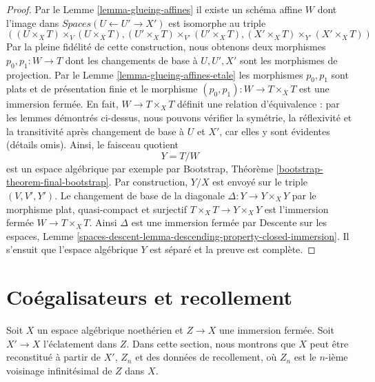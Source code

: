 \begin{proof}
\medskip\noindent
Par le Lemme \ref{lemma-glueing-affines} il existe un schéma affine $W$ dont
l'image dans $\textit{Spaces}(U \leftarrow U' \to X')$ est isomorphe au
triple
$$
((U \times_X T) \times_V (U \times_X T),
(U' \times_X T) \times_{V'} (U' \times_X T),
(X' \times_X T) \times_{Y'} (X' \times_X T))
$$
Par la pleine fidélité de cette construction, nous obtenons
deux morphismes $p_0, p_1 : W \to T$ dont les changements de base
à $U, U', X'$ sont les morphismes de projection.
Par le Lemme \ref{lemma-glueing-affines-etale}
les morphismes $p_0, p_1$ sont plats et de présentation finie et
le morphisme $(p_0, p_1) : W \to T \times_X T$ est une immersion fermée.
En fait, $W \to T \times_X T$ définit une relation d'équivalence : par les lemmes
démontrés ci-dessus, nous pouvons vérifier la symétrie, la réflexivité et la transitivité
après changement de base à $U$ et $X'$, car elles y sont évidentes (détails omis).
Ainsi, le faisceau quotient
$$
Y = T/W
$$
est un espace algébrique par exemple par
Bootstrap, Théorème \ref{bootstrap-theorem-final-bootstrap}. Par construction, $Y/X$ est envoyé sur le triple $(V, V', Y')$. Le changement de base de la diagonale $\Delta : Y \to Y \times_X Y$ par le morphisme plat, quasi-compact et surjectif $T \times_X T \to Y \times_X Y$ est l'immersion fermée $W \to T \times_X T$. Ainsi $\Delta$ est une immersion fermée par Descente sur les espaces, Lemme \ref{spaces-descent-lemma-descending-property-closed-immersion}. Il s'ensuit que l'espace algébrique $Y$ est séparé et la preuve est complète. 
\end{proof}








\section{Coégalisateurs et recollement}
\label{section-coequalizer-glue}

\noindent
Soit $X$ un espace algébrique noethérien et $Z \to X$ une immersion fermée.
Soit $X' \to X$ l'éclatement dans $Z$. Dans cette section, nous montrons que
$X$ peut être reconstitué à partir de $X'$, $Z_n$ et des données de recollement, où $Z_n$
est le $n$-ième voisinage infinitésimal de $Z$ dans $X$.

